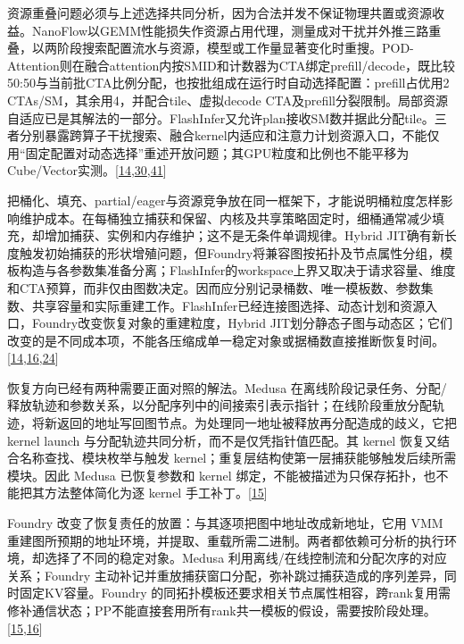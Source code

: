 \documentclass[
  UTF8,
  zihao=5]{ctexart}
\begin{document}
资源重叠问题必须与上述选择共同分析，因为合法并发不保证物理共置或资源收益。NanoFlow以GEMM性能损失作资源占用代理，测量成对干扰并外推三路重叠，以两阶段搜索配置流水与资源，模型或工作量显著变化时重搜。POD-Attention则在融合attention内按SMID和计数器为CTA绑定prefill/decode，既比较50:50与当前批CTA比例分配，也按批组成在运行时自动选择配置：prefill占优用2
CTAs/SM，其余用4，并配合tile、虚拟decode
CTA及prefill分裂限制。局部资源自适应已是其解法的一部分。FlashInfer又允许plan接收SM数并据此分配tile。三者分别暴露跨算子干扰搜索、融合kernel内适应和注意力计划资源入口，不能仅用``固定配置对动态选择''重述开放问题；其GPU粒度和比例也不能平移为Cube/Vector实测。{[}\protect\hyperlink{ref-ye2025flashinfer}{14},\protect\hyperlink{ref-zhu2025nanoflow}{30},\protect\hyperlink{ref-kamath2025pod}{41}{]}

把桶化、填充、partial/eager与资源竞争放在同一框架下，才能说明桶粒度怎样影响维护成本。在每桶独立捕获和保留、内核及共享策略固定时，细桶通常减少填充，却增加捕获、实例和内存维护；这不是无条件单调规律。Hybrid
JIT确有新长度触发初始捕获的形状增殖问题，但Foundry将兼容图按拓扑及节点属性分组，模板构造与各参数集准备分离；FlashInfer的workspace上界又取决于请求容量、维度和CTA预算，而非仅由图数决定。因而应分别记录桶数、唯一模板数、参数集数、共享容量和实际重建工作。FlashInfer已经连接图选择、动态计划和资源入口，Foundry改变恢复对象的重建粒度，Hybrid
JIT划分静态子图与动态区；它们改变的是不同成本项，不能各压缩成单一稳定对象或据桶数直接推断恢复时间。{[}\protect\hyperlink{ref-ye2025flashinfer}{14},\protect\hyperlink{ref-liu2026foundry}{16},\protect\hyperlink{ref-yadav2026hybridpreprint}{24}{]}

恢复方向已经有两种需要正面对照的解法。Medusa
在离线阶段记录任务、分配/释放轨迹和参数关系，以分配序列中的间接索引表示指针；在线阶段重放分配轨迹，将新返回的地址写回图节点。为处理同一地址被释放再分配造成的歧义，它把
kernel launch 与分配轨迹共同分析，而不是仅凭指针值匹配。其 kernel
恢复又结合名称查找、模块枚举与触发
kernel；重复层结构使第一层捕获能够触发后续所需模块。因此 Medusa
已恢复参数和 kernel
绑定，不能被描述为只保存拓扑，也不能把其方法整体简化为逐 kernel
手工补丁。{[}\protect\hyperlink{ref-zeng2025medusa}{15}{]}

Foundry 改变了恢复责任的放置：与其逐项把图中地址改成新地址，它用 VMM
重建图所预期的地址环境，并提取、重载所需二进制。两者都依赖可分析的执行环境，却选择了不同的稳定对象。Medusa
利用离线/在线控制流和分配次序的对应关系；Foundry
主动补记并重放捕获窗口分配，弥补跳过捕获造成的序列差异，同时固定KV容量。Foundry
的同拓扑模板还要求相关节点属性相容，跨rank复用需修补通信状态；PP不能直接套用所有rank共一模板的假设，需要按阶段处理。{[}\protect\hyperlink{ref-zeng2025medusa}{15},\protect\hyperlink{ref-liu2026foundry}{16}{]}
\end{document}
